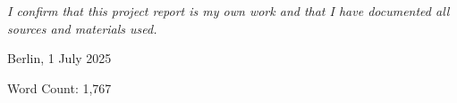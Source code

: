 \chapter*{}
\vspace{17cm}
\hfill\parbox{8cm}{
\raggedleft
	\textit{I confirm that this project report is my own work and that I have documented all sources and materials used.}\par 
	\vspace{1em}
	Berlin, 1 July 2025

	\vspace{3em}
	{\footnotesize Word Count: 1,767}
}
\thispagestyle{plain}